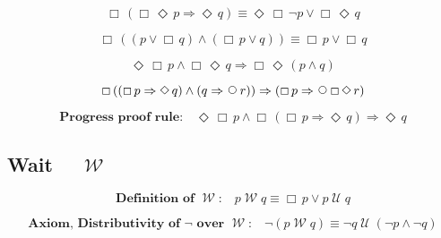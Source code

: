\documentclass[12pt, fleqn, leqno]{article}
\newcommand{\impl}{\ensuremath{\Rightarrow}}        %
\newcommand{\Until}{\;\mathcal{U}\;}
\newcommand{\Wait}{\;\mathcal{W}\;}
\newcommand{\Next}{\;\,\text{\raisebox{3.5pt}{\circle{6}}}}
\newcommand{\Event}{\Diamond\,}
\newcommand{\Always}{\Box\,}
\newcommand{\spacer}{\vspace{-30pt}}
\newcommand{\firstspacer}{\vspace{-26pt}}
\begin{document}
\spacer

\begin{equation}\label{E:BenAriequiv1}
\Always (\Always\Event p \impl \Event q) \equiv \Event\Always\neg p \lor \Always\Event q
\end{equation}

\spacer

\begin{equation}\label{E:BenAriequiv2}
\Always ((p \lor \Always q) \land (\Always p \lor q)) \equiv \Always p \lor \Always q
\end{equation}

\spacer

\begin{equation}\label{E:eventAlwaysPAndAlwaysEventQ}
\Event\Always p\land \Always\Event q \impl \Always\Event (p\land q)
\end{equation}

\spacer

\begin{equation}\label{E:kroger49}
 \Always ((\Always p \impl \Event q) \land (q \impl \Next r)) \impl (\Always p \impl \Next \Always \Event r)
\end{equation}

\spacer

\begin{equation}\label{E:PrProofRule}
\textbf{Progress proof rule:}\quad \Event\Always p \land \Always(\Always p \impl \Event q) \impl \Event q
\end{equation}

\subsection*{Wait $\quad\Wait$}

\begin{equation}\label{E:defWait}
\textbf{Definition of $\Wait$:}\quad p \Wait q \equiv \Always p\lor p \Until q
\end{equation}

\firstspacer

\begin{equation}\label{E:notWait}
\textbf{Axiom, Distributivity of $\neg$ over $\Wait$:}\quad \neg (p \Wait q) \equiv \neg q \Until (\neg p \land \neg q)
\end{equation}
\end{document}
